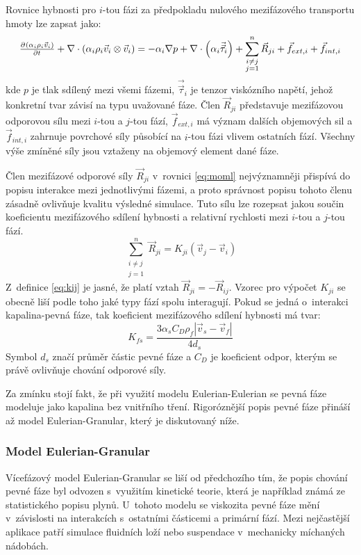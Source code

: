 Rovnice hybnosti pro $i$-tou fázi za předpokladu nulového mezifázového transportu hmoty lze zapsat jako:
\begin{equation}
	\pd{\kula{\alpha_{i}\rho_{i}\vec{v}_{i}}}{t} + \nabla \cdot \kula{\alpha_{i}\rho_{i} \vec{v}_{i} \otimes \vec{v}_{i}} = -\alpha_{i} \nabla p + \nabla \cdot \left(\alpha_{i} \vec{\vec{\tau}}_{i} \right) +\sum_{\substack{ i \neq j \\ j=1}}^{n} \vec{R}_{ji} + \vec{f}_{ext,i} + \vec{f}_{int,i}
	\label{eq:moml}
\end{equation}
\noindent kde $p$ je tlak sdílený mezi všemi fázemi, $\vec{\vec{\tau}}_{i}$ je tenzor viskózního napětí, jehož konkretní tvar závisí na typu uvažované fáze. Člen $\vec{R}_{ji}$ představuje mezifázovou odporovou sílu mezi $i$-tou a $j$-tou fází, $\vec{f}_{ext,i}$ má význam dalších objemových sil a $\vec{f}_{int,i}$ zahrnuje povrchové síly působící na $i$-tou fázi vlivem ostatních fází. Všechny výše zmíněné síly jsou vztaženy na objemový element dané fáze. 

Člen mezifázové odporové síly $\vec{R}_{ji}$ v~rovnici \ref{eq:moml} nejvýznamněji přispívá do popisu interakce mezi jednotlivými fázemi, a proto správnost popisu tohoto členu zásadně ovlivňuje kvalitu výsledné simulace. Tuto sílu lze rozepsat jakou součin koeficientu mezifázového sdílení hybnosti a relativní rychlosti mezi $i$-tou a $j$-tou fází.
\begin{equation}
	 \sum_{\substack{ i \neq j \\ j=1}}^{n} \vec{R}_{ji} = K_{ji} \left( \vec{v}_{j} - \vec{v}_{i} \right)
	\label{eq:kij}
\end{equation}
Z~definice \ref{eq:kij} je jasné, že platí vztah $\vec{R}_{ji} = -\vec{R}_{ij}$. Vzorec pro výpočet $K_{ji}$ se obecně liší podle toho jaké typy fází spolu interagují. Pokud se jedná o~interakci kapalina-pevná fáze, tak koeficient mezifázového sdílení hybnosti má tvar:
\begin{equation}
	K_{fs}= \frac{3\alpha_{s}C_{D}\rho_{f}\left|\vec{v}_{s} - \vec{v}_{f}\right|}{4d_{s}}
	\label{eq:kfs}
\end{equation}
Symbol $d_{s}$ značí průměr částic pevné fáze a $C_{D}$ je koeficient odpor, kterým se právě ovlivňuje chování odporové síly. 
 
Za zmínku stojí fakt, že při využití modelu Eulerian-Eulerian se pevná fáze modeluje jako kapalina bez vnitřního tření. Rigoróznější popis pevné fáze přináší až model Eulerian-Granular, který je diskutovaný níže. 

\subsubsection{Model Eulerian-Granular}
\label{sec:egm}
Vícefázový model Eulerian-Granular se liší od předchozího tím, že  popis chování pevné fáze byl odvozen s~využitím kinetické teorie, která je například známá ze statistického popisu plynů. U~tohoto modelu se viskozita pevné fáze mění v~závislosti na interakcích s~ostatními částicemi a primární fází. Mezi nejčastější aplikace patří simulace fluidních loží nebo suspendace v~mechanicky míchaných nádobách.

